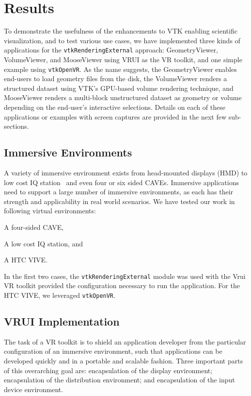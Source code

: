 \section{Results}

To demonstrate the usefulness of the enhancements to VTK enabling scientific
visualization, and to test various use cases, we have implemented three kinds of
applications for the \texttt{vtkRenderingExternal} approach: GeometryViewer, VolumeViewer, and MooseViewer using VRUI as the VR toolkit, and one simple example using \texttt{vtkOpenVR}. As the name suggests, the GeometryViewer enables end-users to load geometry files from the disk, the VolumeViewer renders a structured dataset using VTK's GPU-based volume rendering technique, and MooseViewer renders a multi-block unstructured dataset as geometry or volume depending on the end-user's interactive selections. Details on each of these applications or examples with screen captures are provided in the next few sub-sections. 

\subsection{Immersive Environments}

A variety of immersive environment exists from head-mounted displays (HMD) to low cost IQ station~\cite{Sherman:2010} and even four or six sided CAVEs. Immersive applications need to support a large number of immersive environments, as each has their strength and applicability in real world scenarios. We have tested our work in following virtual environments: 

\begin{compactitem}
\item A four-sided CAVE,
\item A low cost IQ station, and 
\item A HTC VIVE.
\end{compactitem}

In the first two cases, the \texttt{vtkRenderingExternal} module was used with the Vrui VR toolkit provided the configuration necessary to run the application. For the HTC VIVE, we leveraged \texttt{vtkOpenVR}. 

\subsection{VRUI Implementation}

The task of a VR toolkit is to shield an application developer from the particular configuration of an immersive environment, such that applications can be developed quickly and in a portable and scalable fashion. Three important parts of this overarching goal are: encapsulation of the display environment; encapsulation of the distribution environment; and encapsulation of the input device environment.

